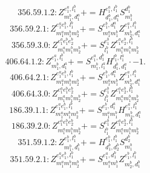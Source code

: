 \documentclass[letterpaper,10pt,fleqn,leqno,onecolumn]{article}
\begin{document}
\begin{equation} \;\;\;\;\;\;  356.59.1.2: Z^{e_{1}^{a},l_{1}^{b}}_{m_{1}^{b},d_{1}^{a}}+=H^{e_{1}^{a},l_{1}^{b}}_{d_{1}^{b},d_{1}^{a}}S^{d_{1}^{b}}_{m_{1}^{b}} \end{equation}
\begin{equation} \;\;\;\;\;\;  356.59.2.1: Z^{e_{1}^{a}e_{1}^{b},l_{1}^{b}}_{m_{1}^{a}m_{1}^{b}m_{2}^{b}}+=S^{e_{1}^{b},d_{1}^{a}}_{m_{1}^{a}m_{1}^{b}}Z^{e_{1}^{a},l_{1}^{b}}_{m_{2}^{b},d_{1}^{a}} \end{equation}
\begin{equation} \;\;\;\;\;\;  356.59.3.0: Z^{e_{1}^{a}e_{1}^{b}e_{2}^{b}}_{m_{1}^{a}m_{1}^{b}m_{2}^{b}}+=S^{e_{1}^{b}}_{l_{1}^{b}}Z^{e_{1}^{a}e_{2}^{b},l_{1}^{b}}_{m_{1}^{a}m_{1}^{b}m_{2}^{b}} \end{equation}
\begin{equation} \;\;\;\;\;\;  406.64.1.2: Z^{e_{1}^{a},l_{1}^{b}}_{m_{1}^{b},d_{1}^{a}}+=S^{e_{1}^{a},d_{1}^{b}}_{m_{1}^{b},l_{1}^{a}}H^{l_{1}^{b},l_{1}^{a}}_{d_{1}^{b},d_{1}^{a}}\cdot -1. \end{equation}
\begin{equation} \;\;\;\;\;\;  406.64.2.1: Z^{e_{1}^{a}e_{1}^{b},l_{1}^{b}}_{m_{1}^{a}m_{1}^{b}m_{2}^{b}}+=S^{e_{1}^{b},d_{1}^{a}}_{m_{1}^{a}m_{1}^{b}}Z^{e_{1}^{a},l_{1}^{b}}_{m_{2}^{b},d_{1}^{a}} \end{equation}
\begin{equation} \;\;\;\;\;\;  406.64.3.0: Z^{e_{1}^{a}e_{1}^{b}e_{2}^{b}}_{m_{1}^{a}m_{1}^{b}m_{2}^{b}}+=S^{e_{1}^{b}}_{l_{1}^{b}}Z^{e_{1}^{a}e_{2}^{b},l_{1}^{b}}_{m_{1}^{a}m_{1}^{b}m_{2}^{b}} \end{equation}
\begin{equation} \;\;\;\;\;\;  186.39.1.1: Z^{e_{1}^{a}e_{1}^{b},l_{1}^{b}}_{m_{1}^{a}m_{1}^{b}m_{2}^{b}}+=S^{e_{1}^{b},d_{1}^{a}}_{m_{1}^{a}m_{1}^{b}}H^{e_{1}^{a},l_{1}^{b}}_{m_{2}^{b},d_{1}^{a}} \end{equation}
\begin{equation} \;\;\;\;\;\;  186.39.2.0: Z^{e_{1}^{a}e_{1}^{b}e_{2}^{b}}_{m_{1}^{a}m_{1}^{b}m_{2}^{b}}+=S^{e_{1}^{b}}_{l_{1}^{b}}Z^{e_{1}^{a}e_{2}^{b},l_{1}^{b}}_{m_{1}^{a}m_{1}^{b}m_{2}^{b}} \end{equation}
\begin{equation} \;\;\;\;\;\;  351.59.1.2: Z^{e_{1}^{b},l_{1}^{b}}_{m_{1}^{b},d_{1}^{b}}+=H^{e_{1}^{b},l_{1}^{b}}_{d_{1}^{b},d_{2}^{b}}S^{d_{2}^{b}}_{m_{1}^{b}} \end{equation}
\begin{equation} \;\;\;\;\;\;  351.59.2.1: Z^{e_{1}^{a}e_{1}^{b},l_{1}^{b}}_{m_{1}^{a}m_{1}^{b}m_{2}^{b}}+=S^{e_{1}^{a},d_{1}^{b}}_{m_{1}^{a}m_{1}^{b}}Z^{e_{1}^{b},l_{1}^{b}}_{m_{2}^{b},d_{1}^{b}} \end{equation}
\end{document}
